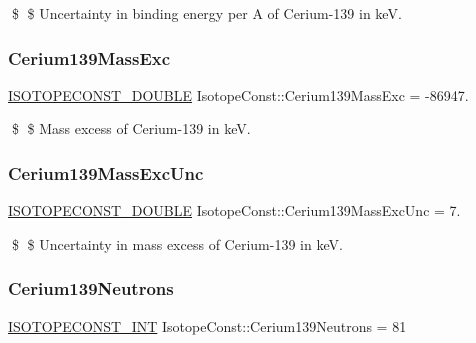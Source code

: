 \$ \$ Uncertainty in binding energy per A of Cerium-\/139 in keV. \mbox{\label{group___isotope_const-_cerium-_ce139_ga27c28be23892fb0a22372611bdd51558}} 
\subsubsection{\texorpdfstring{Cerium139\+Mass\+Exc}{Cerium139MassExc}}
{\footnotesize\ttfamily \mbox{\hyperlink{group___isotope_const-_macros_ga8f45a7272ce02c0b4c65c44636ed719a}{I\+S\+O\+T\+O\+P\+E\+C\+O\+N\+S\+T\+\_\+\+D\+O\+U\+B\+LE}} Isotope\+Const\+::\+Cerium139\+Mass\+Exc = -\/86947.}

\$ \$ Mass excess of Cerium-\/139 in keV. \mbox{\label{group___isotope_const-_cerium-_ce139_gad0c171134fdfffc737663e51281cc214}} 
\subsubsection{\texorpdfstring{Cerium139\+Mass\+Exc\+Unc}{Cerium139MassExcUnc}}
{\footnotesize\ttfamily \mbox{\hyperlink{group___isotope_const-_macros_ga8f45a7272ce02c0b4c65c44636ed719a}{I\+S\+O\+T\+O\+P\+E\+C\+O\+N\+S\+T\+\_\+\+D\+O\+U\+B\+LE}} Isotope\+Const\+::\+Cerium139\+Mass\+Exc\+Unc = 7.}

\$ \$ Uncertainty in mass excess of Cerium-\/139 in keV. \mbox{\label{group___isotope_const-_cerium-_ce139_ga3fc0040b116a55f679f2bc561f2a1a43}} 
\subsubsection{\texorpdfstring{Cerium139\+Neutrons}{Cerium139Neutrons}}
{\footnotesize\ttfamily \mbox{\hyperlink{group___isotope_const-_macros_ga5f18360b3e99483a35c32d789e62621c}{I\+S\+O\+T\+O\+P\+E\+C\+O\+N\+S\+T\+\_\+\+I\+NT}} Isotope\+Const\+::\+Cerium139\+Neutrons = 81}

